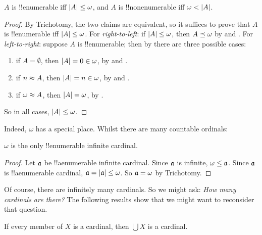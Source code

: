 \documentclass[../../../include/open-logic-section]{subfiles}
\begin{document}
\begin{prop}
$A$ is !!{enumerable} iff $\left| A \right| \leq \omega$, and $A$ is
!!{nonenumerable} iff $\omega < \left| A \right|$.
\end{prop}

\begin{proof}
By Trichotomy, the two claims are equivalent, so it suffices to prove
that $A$ is !!{enumerable} iff $\left| A \right| \leq \omega$. For
\emph{right-to-left}: if $\left| A \right| \leq \omega$, then
$A \preceq \omega$ by
 and
. For \emph{left-to-right}: suppose $A$ is
!!{enumerable}; then by  there
are three possible cases:
\begin{enumerate}
	\item if $A = \emptyset$, then $\left| A \right| = 0 \in \omega$, by
	 and
	.
	\item if $n \approx A$, then $\left| A \right| = n \in \omega$, by
	 and
	.
	\item if $\omega \approx A$, then $\left| A \right| = \omega$, by .
\end{enumerate}
So in all cases, $\left| A \right| \leq \omega$. 
\end{proof}
\noindent
Indeed, $\omega$ has a special place. Whilst there are many countable ordinals:

\begin{cor}
$\omega$ is the only !!{enumerable} infinite cardinal.
\end{cor}

\begin{proof}
Let $\mathfrak{a}$ be !!a{enumerable} infinite cardinal. Since
$\mathfrak{a}$ is infinite, $\omega \leq \mathfrak{a}$. Since
$\mathfrak{a}$ is !!a{enumerable} cardinal, $\mathfrak{a} =
\left| \mathfrak{a} \right| \leq \omega$. So $\mathfrak{a} = \omega$ by
Trichotomy. \end{proof}

Of course, there are infinitely many cardinals. So we might ask:
\emph{How many cardinals are there?} The following results show that
we might want to reconsider that question.

\begin{prop}
If every member of $X$ is a cardinal, then $\bigcup X$ is a cardinal.
\end{prop}
\end{document}
